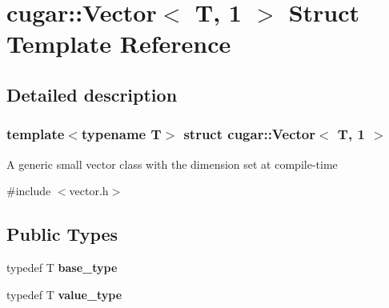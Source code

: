 \hypertarget{structcugar_1_1_vector_3_01_t_00_011_01_4}{}\section{cugar\+:\+:Vector$<$ T, 1 $>$ Struct Template Reference}
\label{structcugar_1_1_vector_3_01_t_00_011_01_4}


\subsection{Detailed description}
\subsubsection*{template$<$typename T$>$\newline
struct cugar\+::\+Vector$<$ T, 1 $>$}

A generic small vector class with the dimension set at compile-\/time 

{\ttfamily \#include $<$vector.\+h$>$}

\subsection*{Public Types}
\begin{DoxyCompactItemize}
\item 
\mbox{\label{structcugar_1_1_vector_3_01_t_00_011_01_4_aa23ca8f4b9924a7f524a5a3ca6cd4c7a}} 
typedef T {\bfseries base\+\_\+type}
\item 
\mbox{\label{structcugar_1_1_vector_3_01_t_00_011_01_4_ac00f00b41d7c0a1df4dc7fef29f31639}} 
typedef T {\bfseries value\+\_\+type}
\end{DoxyCompactItemize}
